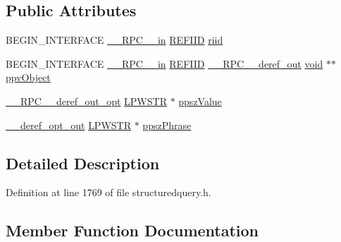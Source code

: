 \subsection*{Public Attributes}
\begin{DoxyCompactItemize}
\item 
B\+E\+G\+I\+N\+\_\+\+I\+N\+T\+E\+R\+F\+A\+CE \hyperlink{rpcsal_8h_a20b7f6da600a05c8b541659f14f7f0e6}{\+\_\+\+\_\+\+R\+P\+C\+\_\+\+\_\+in} \hyperlink{px__win__ds_8c_a80ec49c8ae61e234197d5071d2df497d}{R\+E\+F\+I\+ID} \hyperlink{struct_i_named_entity_vtbl_aec1f6ed4a3d155e3e9f9385e098d6123}{riid}
\item 
B\+E\+G\+I\+N\+\_\+\+I\+N\+T\+E\+R\+F\+A\+CE \hyperlink{rpcsal_8h_a20b7f6da600a05c8b541659f14f7f0e6}{\+\_\+\+\_\+\+R\+P\+C\+\_\+\+\_\+in} \hyperlink{px__win__ds_8c_a80ec49c8ae61e234197d5071d2df497d}{R\+E\+F\+I\+ID} \hyperlink{rpcsal_8h_a23bc188526f10656f9c79d950f6c3192}{\+\_\+\+\_\+\+R\+P\+C\+\_\+\+\_\+deref\+\_\+out} \hyperlink{sound_8c_ae35f5844602719cf66324f4de2a658b3}{void} $\ast$$\ast$ \hyperlink{struct_i_named_entity_vtbl_abdbd2588aed6eb6c059d0f40555bba03}{ppv\+Object}
\item 
\hyperlink{rpcsal_8h_ab29e89ceb0eb0b075c6f6299b0de6a21}{\+\_\+\+\_\+\+R\+P\+C\+\_\+\+\_\+deref\+\_\+out\+\_\+opt} \hyperlink{mapinls_8h_acc28f72b93422cfd63a60e5a102a77b1}{L\+P\+W\+S\+TR} $\ast$ \hyperlink{struct_i_named_entity_vtbl_af4687d30d84b2c5443227d1ec098e88b}{ppsz\+Value}
\item 
\hyperlink{sal_8h_aca83a5a174d598aaeea78f024e4af103}{\+\_\+\+\_\+deref\+\_\+opt\+\_\+out} \hyperlink{mapinls_8h_acc28f72b93422cfd63a60e5a102a77b1}{L\+P\+W\+S\+TR} $\ast$ \hyperlink{struct_i_named_entity_vtbl_a9fe1253444ff91486bc53eb64a30cb1b}{ppsz\+Phrase}
\end{DoxyCompactItemize}


\subsection{Detailed Description}


Definition at line 1769 of file structuredquery.\+h.



\subsection{Member Function Documentation}
